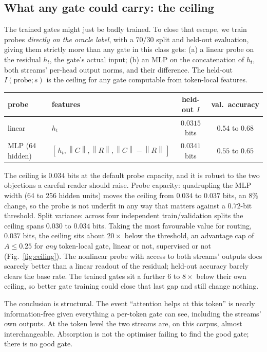 \documentclass[11pt,a4paper]{article}
\newcommand{\norm}[1]{\left\lVert#1\right\rVert}
\begin{document}
\subsection{What any gate could carry: the ceiling}
\label{sec:ceiling-probe}

The trained gates might just be badly trained. To close that escape, we
train probes \emph{directly on the oracle label}, with a 70/30 split and
held-out evaluation, giving them strictly more than any gate in this
class gets: (a) a linear probe on the residual $h_t$, the gate's actual
input; (b) an MLP on the concatenation of $h_t$, both streams' per-head
output norms, and their difference. The held-out $I(\text{probe}; s)$ is
the ceiling for any gate computable from token-local features.

\begin{center}
\begin{tabular}{llcc}
\toprule
probe & features & held-out $I$ & val.\ accuracy \\
\midrule
linear & $h_t$ & $0.0315$ bits & $0.54$ to $0.68$ \\
MLP (64 hidden) & $[\,h_t, \norm{C}, \norm{R}, \norm{C}{-}\norm{R}\,]$ & $0.0341$ bits & $0.55$ to $0.65$ \\
\bottomrule
\end{tabular}
\end{center}

The ceiling is $0.034$ bits at the default probe capacity, and it is
robust to the two objections a careful reader should raise. Probe
capacity: quadrupling the MLP width (64 to 256 hidden units) moves the
ceiling from $0.034$ to $0.037$ bits, an $8\%$ change, so the probe is
not underfit in any way that matters against a $0.72$-bit threshold.
Split variance: across four independent train/validation splits the
ceiling spans $0.030$ to $0.034$ bits. Taking the most favourable value
for routing, $0.037$ bits, the ceiling sits about $20\times$ below the
threshold, an advantage cap of $A \le 0.25$ for \emph{any} token-local
gate, linear or not, supervised or not (Fig.~\ref{fig:ceiling}). The
nonlinear probe with access to both streams' outputs does scarcely
better than a linear readout of the residual; held-out accuracy barely
clears the base rate. The trained gates sit a further $6$ to $8\times$
below their own ceiling, so better gate training could close that last
gap and still change nothing.

The conclusion is structural. The event ``attention helps at this token''
is nearly information-free given everything a per-token gate can see,
including the streams' own outputs. At the token level the two streams
are, on this corpus, almost interchangeable. Absorption is not the
optimiser failing to find the good gate; there is no good gate.
\end{document}
